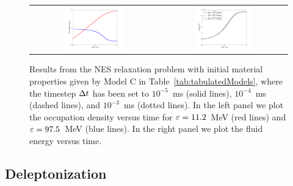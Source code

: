 \documentclass[10pt,preprint]{aastex}
\begin{document}
\begin{figure}
  \begin{center}
    \begin{tabular}{cc}
      \includegraphics[width=0.475\textwidth]{./Figures/RelaxationNES_DensitiesVsTime_Timestep.png} &
      \includegraphics[width=0.475\textwidth]{./Figures/RelaxationNES_EnergiesVsTime_Timestep.png}
    \end{tabular}
  \end{center}
  \caption{Results from the NES relaxation problem with initial material properties given by Model C in Table~\ref{tab:tabulatedModels}, where the timestep $\Delta t$ has been set to $10^{-5}$~ms (solid lines), $10^{-4}$~ms (dashed lines), and $10^{-3}$~ms (dotted lines).  In the left panel we plot the occupation density versus time for $\varepsilon=11.2$~MeV (red lines) and $\varepsilon=97.5$~MeV (blue lines).  In the right panel we plot the fluid energy versus time.}
  \label{fig:RelaxationNES_Timestep}
\end{figure}

\subsection{Deleptonization}
\end{document}
